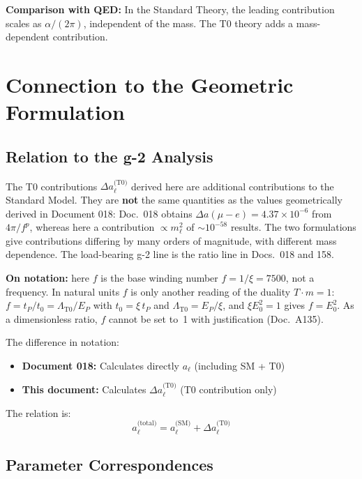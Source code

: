 	\textbf{Comparison with QED:} In the Standard Theory, the leading contribution scales as $\alpha/(2\pi)$, independent of the mass. The T0 theory adds a mass-dependent contribution.
	
	\section{Connection to the Geometric Formulation}
	
	\subsection{Relation to the g-2 Analysis}
	
	The T0 contributions $\Delta a_\ell^{\text{(T0)}}$ derived here are additional contributions to the Standard Model. They are \textbf{not} the same quantities as the values geometrically derived in Document 018: Doc.~018 obtains $\Delta a(\mu{-}e) = 4.37 \times 10^{-6}$ from $4\pi/f^{p}$, whereas here a contribution $\propto m_\ell^2$ of $\sim 10^{-58}$ results. The two formulations give contributions differing by many orders of magnitude, with different mass dependence. The load-bearing g-2 line is the ratio line in Docs.~018 and 158.

	\textbf{On notation:} here $f$ is the base winding number $f = 1/\xi = 7500$, not a frequency. In natural units $f$ is only another reading of the duality $T\cdot m = 1$: $f = t_P/t_0 = \Lambda_{\text{T0}}/E_P$ with $t_0 = \xi\,t_P$ and $\Lambda_{\text{T0}} = E_P/\xi$, and $\xi E_0^2 = 1$ gives $f = E_0^2$. As a dimensionless ratio, $f$ cannot be set to~1 with justification (Doc.~A135).

	The difference in notation:
	\begin{itemize}
		\item \textbf{Document 018:} Calculates directly $a_\ell$ (including SM + T0)
		\item \textbf{This document:} Calculates $\Delta a_\ell^{\text{(T0)}}$ (T0 contribution only)
	\end{itemize}
	
	The relation is:
	\begin{equation}
		a_\ell^{\text{(total)}} = a_\ell^{\text{(SM)}} + \Delta a_\ell^{\text{(T0)}}
		\label{eq:total_relation}
	\end{equation}
	
	\subsection{Parameter Correspondences}
	
